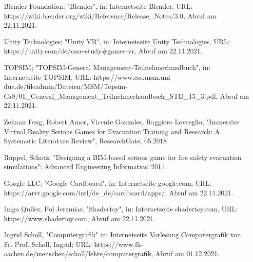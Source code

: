 \documentclass[conference]{IEEEtran}
\begin{document}
\begin{thebibliography}{00}
\vskip 0.05in
 Blender Foundation; "Blender", in: Internetseite Blender, URL: https://wiki.blender.org/wiki/Reference/Release\_Notes/3.0, Abruf am 22.11.2021.

\vskip 0.05in
 Unity Technologies; "Unity VR", in: Internetseite Unity Technologies, URL: https://unity.com/de/case-study\#games-vr, Abruf am 22.11.2021.

\vskip 0.05in
 TOPSIM; "TOPSIM-General Management-Teilnehmerhandbuch", in: Internetseite TOPSIM, URL: https://www.css.msm.uni-due.de/fileadmin/Dateien/MSM/Topsim-Gr8/01\_General\_Management\_Teilnehmerhandbuch\_STD\_15\_3.pdf, Abruf am 22.11.2021.

\vskip 0.05in
 Zehnan Feng, Robert Amor, Vicente Gonzales, Ruggiero Lovreglio; "Immersive Virtual Reality Serious Games for Evacuation Training and Research: A Systematic Literature Review", ResearchGate, 05.2018

\vskip 0.05in
 Rüppel, Schatz; "Designing a BIM-based serious game for fire safety evacuation simulations"; Advanced Engineering Informatics; 2011

\vskip 0.05in
 Google LLC; "Google Cardboard", in: Internetseite google.com, URL: https://arvr.google.com/intl/de\_de/cardboard/apps/, Abruf am 22.11.2021.

\vskip 0.05in
 Inigo Quilez, Pol Jeremias; "Shadertoy", in: Internetseite shadertoy.com, URL: https://www.shadertoy.com, Abruf am 22.11.2021.

\vskip 0.05in
 Ingrid Scholl, "Computergrafik" in: Internetseite Vorlesung Computergrafik von Fr. Prof. Scholl, Ingrid; URL: https://www.fh-aachen.de/menschen/scholl/lehre/computergrafik, Abruf am 01.12.2021.




\end{thebibliography}
\endgroup
\end{document}
